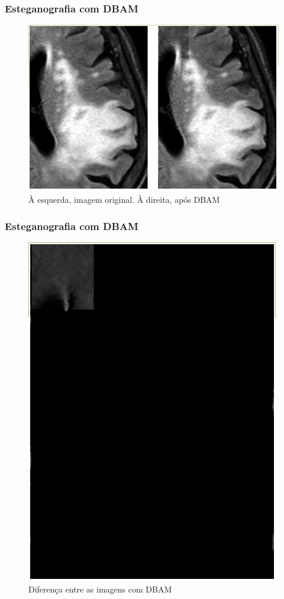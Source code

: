 \documentclass{beamer}
\begin{document}
\begin{frame}
\frametitle{Esteganografia com DBAM}
\begin{figure}
\includegraphics[scale=.2]{DBAM.png} 
\caption{À esquerda, imagem original. À direita, após DBAM}
\end{figure}
\end{frame}
\begin{frame}
\frametitle{Esteganografia com DBAM}
\begin{figure}
\includegraphics[scale=.2]{DBAMdiff.png} 
\caption{Diferença entre as imagens com DBAM}
\end{figure}
\end{frame}
\end{document}
